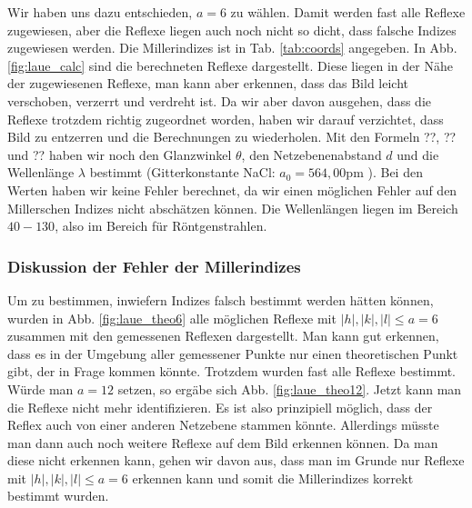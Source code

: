 Wir haben uns dazu entschieden, $a = 6$ zu wählen. Damit werden fast alle Reflexe zugewiesen, aber die Reflexe liegen auch noch nicht so dicht, dass falsche Indizes zugewiesen werden. Die Millerindizes ist in Tab. \ref{tab:coords} angegeben. In Abb. \ref{fig:laue_calc} sind die berechneten Reflexe dargestellt. Diese liegen in der Nähe der zugewiesenen Reflexe, man kann aber erkennen, dass das Bild leicht verschoben, verzerrt und verdreht ist. Da wir aber davon ausgehen, dass die Reflexe trotzdem richtig zugeordnet worden, haben wir darauf verzichtet, dass Bild zu entzerren und die Berechnungen zu wiederholen. Mit den Formeln ??, ?? und ?? haben wir noch den Glanzwinkel $\theta$, den Netzebenenabstand $d$ und die Wellenlänge $\lambda$ bestimmt (Gitterkonstante NaCl: $a_0 = 564,00 \si{\pico\meter}$ \cite{wiki_nacl}). Bei den Werten haben wir keine Fehler berechnet, da wir einen möglichen Fehler auf den Millerschen Indizes nicht abschätzen können. Die Wellenlängen liegen im Bereich $40 - 130$, also im Bereich für Röntgenstrahlen.

\subsubsection{Diskussion der Fehler der Millerindizes}
Um zu bestimmen, inwiefern Indizes falsch bestimmt werden hätten können, wurden in Abb. \ref{fig:laue_theo6} alle möglichen Reflexe mit $|h|,|k|,|l| \leq a = 6$ zusammen mit den gemessenen Reflexen dargestellt. Man kann gut erkennen, dass es in der Umgebung aller gemessener Punkte nur einen theoretischen Punkt gibt, der in Frage kommen könnte. Trotzdem wurden fast alle Reflexe bestimmt. Würde man $a = 12$ setzen, so ergäbe sich Abb. \ref{fig:laue_theo12}. Jetzt kann man die Reflexe nicht mehr identifizieren. Es ist also prinzipiell möglich, dass der Reflex auch von einer anderen Netzebene stammen könnte. Allerdings müsste man dann auch noch weitere Reflexe auf dem Bild erkennen können. Da man diese nicht erkennen kann, gehen wir davon aus, dass man im Grunde nur Reflexe mit $|h|,|k|,|l| \leq a = 6$ erkennen kann und somit die Millerindizes korrekt bestimmt wurden.

